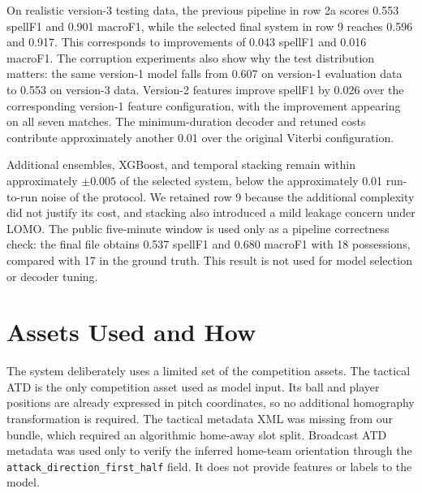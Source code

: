 \documentclass[11pt,a4paper]{article}
\begin{document}
\pagestyle{fancy}

On realistic version-3 testing data, the previous pipeline in row 2a scores 0.553 spellF1 and 0.901 macroF1, while the selected final system in row 9 reaches 0.596 and 0.917. This corresponds to improvements of 0.043 spellF1 and 0.016 macroF1. The corruption experiments also show why the test distribution matters: the same version-1 model falls from 0.607 on version-1 evaluation data to 0.553 on version-3 data. Version-2 features improve spellF1 by 0.026 over the corresponding version-1 feature configuration, with the improvement appearing on all seven matches. The minimum-duration decoder and retuned costs contribute approximately another 0.01 over the original Viterbi configuration.

Additional ensembles, XGBoost, and temporal stacking remain within approximately \(\pm 0.005\) of the selected system, below the approximately 0.01 run-to-run noise of the protocol. We retained row 9 because the additional complexity did not justify its cost, and stacking also introduced a mild leakage concern under LOMO. The public five-minute window is used only as a pipeline correctness check: the final file obtains 0.537 spellF1 and 0.680 macroF1 with 18 possessions, compared with 17 in the ground truth. This result is not used for model selection or decoder tuning.


\section{Assets Used and How}

The system deliberately uses a limited set of the competition assets. The tactical ATD is the only competition asset used as model input. Its ball and player positions are already expressed in pitch coordinates, so no additional homography transformation is required. The tactical metadata XML was missing from our bundle, which required an algorithmic home-away slot split. Broadcast ATD metadata was used only to verify the inferred home-team orientation through the \texttt{attack\_direction\_first\_half} field. It does not provide features or labels to the model.
\end{document}
